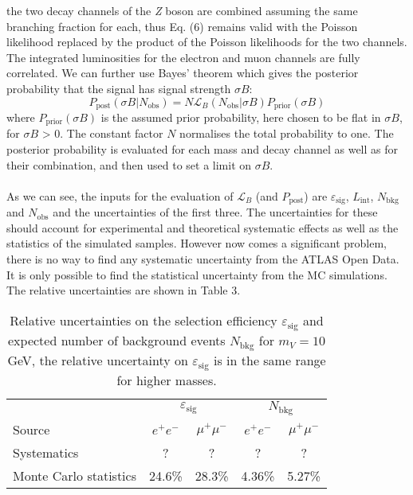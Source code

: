 \documentclass[14pt, a4paper]{book}
\begin{document}
the two decay channels of the \textit{Z} boson are combined assuming the same branching fraction for each, thus Eq. (6) remains valid with the Poisson likelihood replaced by the product of the Poisson likelihoods for the two channels. The integrated luminosities for the electron 
and muon channels are fully correlated. We can further use Bayes’ theorem which gives the posterior probability that the signal has signal strength $\sigma B$:
\begin{equation}
    P_{\text{post}}(\sigma B\vert N_{\text{obs}}) = N \mathcal{L}_B (N_{\text{obs}}\vert\sigma B) P_{\text{prior}}(\sigma B)
\end{equation}
where $P_{\text{prior}}(\sigma B)$ is the assumed prior probability, here chosen to be flat in $\sigma B$, for $\sigma B$ > 0. The constant factor $N$ normalises the total probability to one. The posterior probability is evaluated for each mass and decay channel as well as for their 
combination, and then used to set a limit on $\sigma B$.\\
\\As we can see, the inputs for the evaluation of $\mathcal{L}_B$ (and $P_{\text{post}}$) are $\varepsilon_{\text{sig}}$, $L_{\text{int}}$, $N_{\text{bkg}}$ and $N_{\text{obs}}$ and the uncertainties of the first three. The uncertainties for these should account for experimental 
and theoretical systematic effects as well as the statistics of the simulated samples. However now comes a significant problem, there is no way to find any systematic uncertainty from the ATLAS Open Data. It is only possible to find the statistical uncertainty from the MC simulations. 
The relative uncertainties are shown in Table 3.
\begin{table}[!ht]\centering\caption{Relative uncertainties on the selection efficiency $\varepsilon_{\text{sig}}$ and expected number of background events $N_{\text{bkg}}$ for $m_V= 10$ GeV, the relative uncertainty on $\varepsilon_{\text{sig}}$ is in the same range for higher masses.}
    \begin{tabular}{@{}l|cc|cc@{}}
    \midrule\midrule
    & \multicolumn{2}{c}{$\varepsilon_{\text{sig}}$} \vline &\multicolumn{2}{c}{$N_{\text{bkg}}$}\\
    Source & $e^+e^-$ & $\mu^+\mu^-$ & $e^+e^-$ & $\mu^+\mu^-$  \\ \midrule
    Systematics & ? & ? & ? & ?                                 \\ 
    Monte Carlo statistics & 24.6\% & 28.3\% & 4.36\% & 5.27\%                       \\\midrule\midrule
    \end{tabular}
\end{table}
\end{document}

